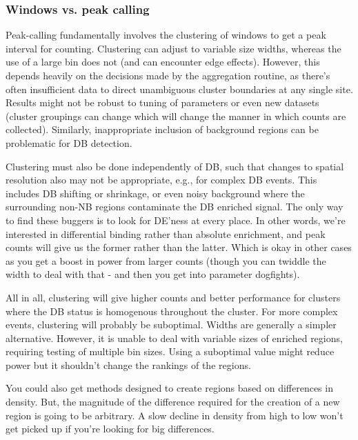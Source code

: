 \documentclass[12pt]{report}
\begin{document}
\subsubsection*{Windows vs. peak calling}

Peak-calling fundamentally involves the clustering of windows to get a peak interval for counting.
Clustering can adjust to variable size widths, whereas the use of a large bin does not (and can encounter edge effects). 
However, this depends heavily on the decisions made by the aggregation routine, as there's often insufficient data to direct unambiguous cluster boundaries at any single site.
Results might not be robust to tuning of parameters or even new datasets (cluster groupings can change which will change the manner in which counts are collected). 
Similarly, inappropriate inclusion of background regions can be problematic for DB detection.

Clustering must also be done independently of DB, such that changes to spatial resolution also may not be appropriate, e.g., for complex DB events.
This includes DB shifting or shrinkage, or even noisy background where the surrounding non-NB regions contaminate the DB enriched signal.  
The only way to find these buggers is to look for DE'ness at every place. 
In other words, we're interested in differential binding rather than absolute enrichment, and peak counts will give us the former rather than the latter.
Which is okay in other cases as you get a boost in power from larger counts (though you can twiddle the width to deal with that - and then you get into parameter dogfights).

All in all, clustering will give higher counts and better performance for clusters where the DB status is homogenous throughout the cluster. 
For more complex events, clustering will probably be suboptimal.
Widths are generally a simpler alternative. 
However, it is unable to deal with variable sizes of enriched regions, requiring testing of multiple bin sizes.
Using a suboptimal value might reduce power but it shouldn't change the rankings of the regions. 

You could also get methods designed to create regions based on differences in density.
But, the magnitude of the difference required for the creation of a new region is going to be arbitrary.
A slow decline in density from high to low won't get picked up if you're looking for big differences.

\end{document}
